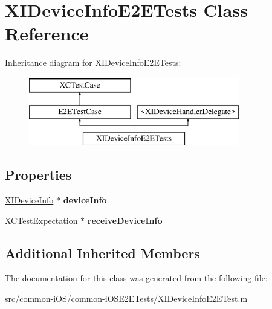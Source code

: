 \hypertarget{interface_x_i_device_info_e2_e_tests}{}\section{X\+I\+Device\+Info\+E2\+E\+Tests Class Reference}
\label{interface_x_i_device_info_e2_e_tests}
Inheritance diagram for X\+I\+Device\+Info\+E2\+E\+Tests\+:\begin{figure}[H]
\begin{center}
\leavevmode
\includegraphics[height=3.000000cm]{interface_x_i_device_info_e2_e_tests}
\end{center}
\end{figure}
\subsection*{Properties}
\begin{DoxyCompactItemize}
\item 
\hypertarget{interface_x_i_device_info_e2_e_tests_a8265f05d5823a9626184f2867abf8f26}{}\label{interface_x_i_device_info_e2_e_tests_a8265f05d5823a9626184f2867abf8f26} 
\hyperlink{class_x_i_device_info}{X\+I\+Device\+Info} $\ast$ {\bfseries device\+Info}
\item 
\hypertarget{interface_x_i_device_info_e2_e_tests_ab1bdad11fc08501c037ca1e3cb2ff91e}{}\label{interface_x_i_device_info_e2_e_tests_ab1bdad11fc08501c037ca1e3cb2ff91e} 
X\+C\+Test\+Expectation $\ast$ {\bfseries receive\+Device\+Info}
\end{DoxyCompactItemize}
\subsection*{Additional Inherited Members}


The documentation for this class was generated from the following file\+:\begin{DoxyCompactItemize}
\item 
src/common-\/i\+O\+S/common-\/i\+O\+S\+E2\+E\+Tests/X\+I\+Device\+Info\+E2\+E\+Test.\+m\end{DoxyCompactItemize}
